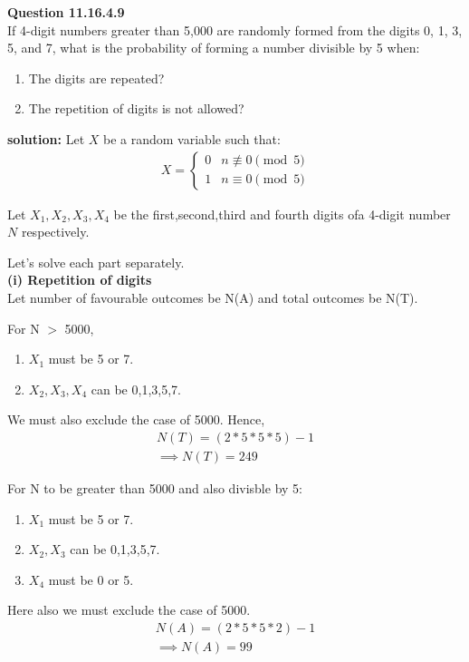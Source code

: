 \documentclass{article}
\begin{document}
\providecommand{\pr}[1]{\ensuremath{\Pr\left(#1\right)}}
\providecommand{\brak}[1]{\ensuremath{\left(#1\right)}}
\newcommand{\solution}{\noindent \textbf{solution: }}

\textbf{Question 11.16.4.9}\\
If 4-digit numbers greater than 5,000 are randomly formed from the digits 0, 1, 3, 5, and 7, what is the probability of forming a number divisible by 5 when:
\begin{enumerate}
    \item The digits are repeated?
    \item The repetition of digits is not allowed?
\end{enumerate}

\solution
Let $X$ be a random variable such that:
\begin{align}
	X = \begin{cases}
		0 & n \not\equiv 0 \pmod{5}\\
		1 & n \equiv 0 \pmod{5}\end{cases}
\end{align}

Let $X_{1},X_{2},X_{3},X_{4}$ be the first,second,third and fourth digits ofa 4-digit number $N$ respectively.

Let's solve each part separately. \\

\textbf{(i) Repetition of digits}\\
Let number of favourable outcomes be N(A) and total outcomes be N(T).

For N $>$ 5000,
\begin{enumerate}
	\item $X_{1}$ must be 5 or 7.
	\item $X_{2},X_{3},X_{4}$ can be 0,1,3,5,7.
\end{enumerate}
We must also exclude the case of 5000.
Hence,
\begin{align}
	N(T)=(2*5*5*5)-1 \\
	\implies N(T)=249
\end{align}

For N to be greater than 5000 and also divisble by 5:
\begin{enumerate}
	\item $X_{1}$ must be 5 or 7.
	\item $X_{2},X_{3}$ can be 0,1,3,5,7.
	\item $X_{4}$ must be 0 or 5.
\end{enumerate}
Here also we must exclude the case of 5000.
\begin{align}
	N(A)=(2*5*5*2)-1 \\
	\implies N(A)=99
\end{align}
\end{document}
